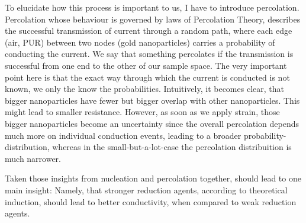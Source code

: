 To elucidate how this process is important to us, I have to introduce percolation. Percolation whose behaviour is governed by laws of Percolation Theory, describes the successful transmission of current through a random path, where each edge (air, PUR) between two nodes (gold nanoparticles) carries a probability of conducting the current. We say that something percolates if the transmission is successful from one end to the other of our sample space. The very important point here is that the exact way through which the current is conducted is not known, we only the know the probabilities. Intuitively, it becomes clear, that bigger nanoparticles have fewer but bigger overlap with other nanoparticles. This might lead to smaller resistance. However, as soon as we apply strain, those bigger nanoparticles become an uncertainty since the overall percolation depends much more on individual conduction events, leading to a broader probability-distribution, whereas in the small-but-a-lot-case the percolation distribuition is much narrower.   

Taken those insights from nucleation and percolation together, should lead to one main insight: Namely, that stronger reduction agents, according to theoretical induction, should lead to better conductivity, when compared to weak reduction agents.

